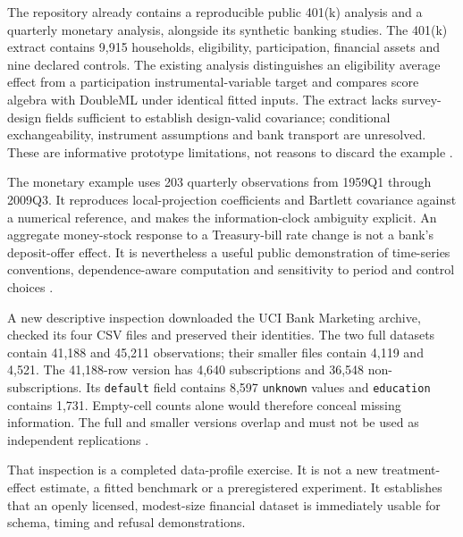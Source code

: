 The repository already contains a reproducible public 401(k) analysis
and a quarterly monetary analysis, alongside its synthetic banking
studies. The 401(k) extract contains 9,915 households, eligibility,
participation, financial assets and nine declared controls. The existing
analysis distinguishes an eligibility average effect from a
participation instrumental-variable target and compares score algebra
with DoubleML under identical fitted inputs. The extract lacks
survey-design fields sufficient to establish design-valid covariance;
conditional exchangeability, instrument assumptions and bank transport
are unresolved. These are informative prototype limitations, not reasons
to discard the example \citep{public401k}.

The monetary example uses 203 quarterly observations from 1959Q1 through
2009Q3. It reproduces local-projection coefficients and Bartlett
covariance against a numerical reference, and makes the
information-clock ambiguity explicit. An aggregate money-stock response
to a Treasury-bill rate change is not a bank's deposit-offer effect. It
is nevertheless a useful public demonstration of time-series
conventions, dependence-aware computation and sensitivity to period and
control choices \citep{public_macrodata_dynamic}.

A new descriptive inspection downloaded the UCI Bank Marketing archive,
checked its four CSV files and preserved their identities. The two full
datasets contain 41,188 and 45,211 observations; their smaller files
contain 4,119 and 4,521. The 41,188-row version has 4,640 subscriptions
and 36,548 non-subscriptions. Its \texttt{default} field contains 8,597
\texttt{unknown} values and \texttt{education} contains 1,731.
Empty-cell counts alone would therefore conceal missing information. The
full and smaller versions overlap and must not be used as independent
replications \citep{pd15_uci_bank,pd15_profile}.

That inspection is a completed data-profile exercise. It is not a new
treatment-effect estimate, a fitted benchmark or a preregistered
experiment. It establishes that an openly licensed, modest-size
financial dataset is immediately usable for schema, timing and refusal
demonstrations.

